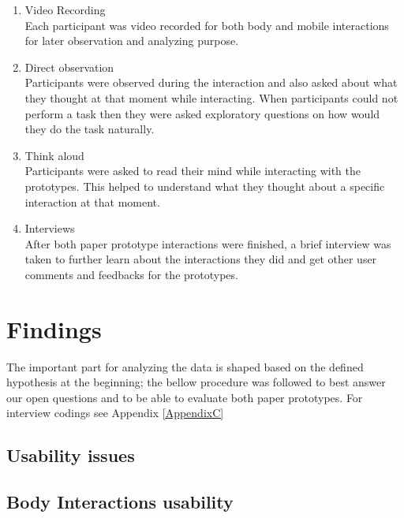 \begin{enumerate}
\item Video Recording \\
Each participant was video recorded for both body and mobile interactions for later observation and analyzing purpose. 

\item Direct observation \\
Participants were observed during the interaction and also asked about what they thought at that moment while interacting. When participants could not perform a task then they were asked exploratory questions on how would they do the task naturally.

\item Think aloud \\
Participants were asked to read their mind while interacting with the prototypes. This helped to understand what they thought about a specific interaction at that moment. 

\item Interviews \\
After both paper prototype interactions were finished, a brief interview was taken to further learn about the interactions they did and get other user comments and feedbacks for the prototypes.
\end{enumerate}


\section{Findings}
The important part for analyzing the data is shaped based on the defined hypothesis at the beginning; the bellow procedure was followed to best answer our open questions and to be able to evaluate both paper prototypes. For interview codings see Appendix \ref{AppendixC}


\subsection{Usability issues}


\subsection{Body Interactions usability}

